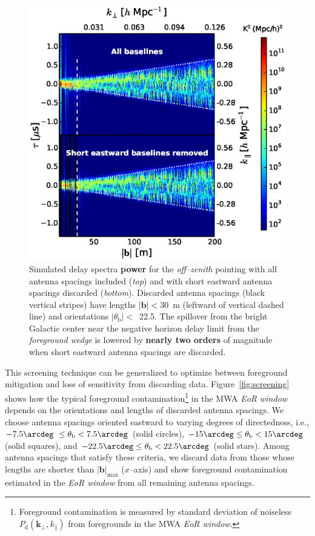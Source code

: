 \documentclass[preprint2,iop,numberedappendix,twocolappendix,appendixfloats]{emulateapj}
\begin{document}
\begin{figure}[htb]
\centering
\includegraphics[width=\linewidth]{figure10.eps}
\caption{Simulated delay spectra {\bf power} for the {\it off--zenith} pointing with all antenna spacings included ({\it top}) and with short eastward antenna spacings discarded ({\it bottom}). Discarded antenna spacings (black vertical stripes) have lengths $|\boldsymbol{b}|<30$~m (leftward of vertical dashed line) and orientations $|\theta_\textrm{b}|<$~22.5\arcdeg. The spillover from the bright Galactic center near the negative horizon delay limit from the {\it foreground wedge} is lowered by {\bf nearly two orders} of magnitude when short eastward antenna spacings are discarded. \label{fig:before-after}}
\end{figure}

This screening technique can be generalized to optimize between foreground mitigation and loss of sensitivity from discarding data. Figure~\ref{fig:screening} shows how the typical foreground contamination\footnote{Foreground contamination is measured by standard deviation of noiseless $P_\textrm{d}(\boldsymbol{k}_\perp,k_\parallel)$ from foregrounds in the MWA {\it EoR window}.} in the MWA {\it EoR window} depends on the orientations and lengths of discarded antenna spacings. We choose antenna spacings oriented eastward to varying degrees of directedness, i.e., $-7.5\arcdeg~\le\theta_\textrm{b} < 7.5\arcdeg$ (solid circles), $-15\arcdeg\le\theta_\textrm{b}< 15\arcdeg$ (solid squares), and $-22.5\arcdeg\le\theta_\textrm{b}< 22.5\arcdeg$ (solid stars). Among antenna spacings that satisfy these criteria, we discard data from those whose lengths are shorter than $|\boldsymbol{b}|_\textrm{max}$ ($x$--axis) and show foreground contamination estimated in the {\it EoR window} from all remaining antenna spacings. 
\end{document}
